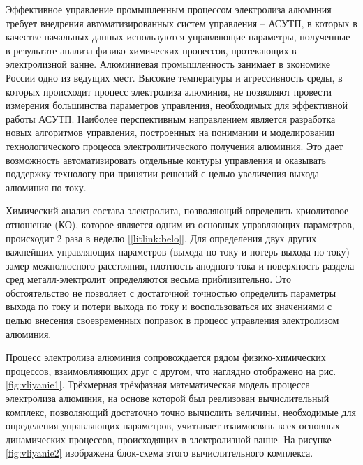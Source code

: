 \documentclass[]{pmi}
\begin{document}
\pmiemptyspace
\pmiemptyspace
{}
%


Эффективное управление промышленным процессом электролиза алюминия требует внедрения автоматизированных систем управления – АСУТП, в которых в качестве начальных данных используются управляющие параметры, полученные в результате анализа физико-химических процессов, протекающих в электролизной ванне. Алюминиевая промышленность занимает в экономике России одно из ведущих мест. Высокие температуры и агрессивность среды, в которых происходит процесс электролиза алюминия, не позволяют провести измерения большинства параметров управления, необходимых для эффективной работы АСУТП. Наиболее перспективным направлением является разработка новых алгоритмов управления, построенных на понимании и моделировании технологического процесса электролитического получения алюминия. Это дает возможность автоматизировать отдельные контуры управления и оказывать поддержку технологу при принятии решений с целью увеличения выхода алюминия по току. 

Химический анализ состава электролита, позволяющий определить криолитовое отношение (КО), которое является одним из основных управляющих параметров, происходит 2 раза в неделю [\ref{litlink:belo}]. Для определения двух других важнейших управляющих параметров (выхода по току и потерь выхода по току) замер межполюсного расстояния, плотность анодного тока и поверхность раздела сред металл-электролит определяются весьма приблизительно. Это обстоятельство не позволяет с достаточной точностью определить параметры выхода по току и потери выхода по току и воспользоваться их значениями с целью внесения своевременных поправок в процесс управления электролизом алюминия.

Процесс электролиза алюминия сопровождается рядом физико-химических процессов, взаимовлияющих друг с другом, что наглядно отображено на рис. \ref{fig:vliyanie1}. Трёхмерная трёхфазная математическая модель процесса электролиза алюминия, на основе которой был реализован вычислительный комплекс, позволяющий достаточно точно вычислить величины, необходимые для определения управляющих параметров, учитывает взаимосвязь всех основных динамических процессов, происходящих в электролизной ванне. На рисунке \ref{fig:vliyanie2} изображена блок-схема этого вычислительного комплекса.
\end{document}
